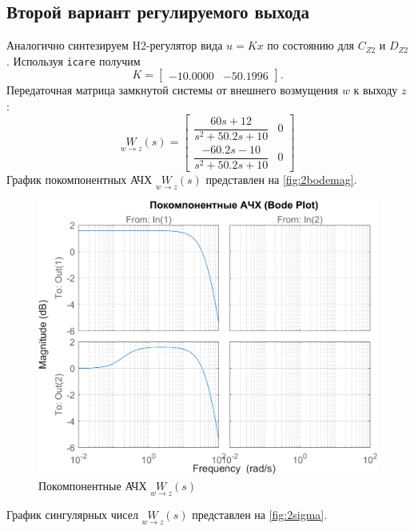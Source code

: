 \subsection{Второй вариант регулируемого выхода}
\label{sec:regout2}
Аналогично синтезируем H2-регулятор вида $u=Kx$ по состоянию для $C_{Z2}$ и $D_{Z2}$.
Используя \texttt{icare} получим
\begin{equation*}
    K=\begin{bmatrix}
        -10.0000&-50.1996
    \end{bmatrix}.
\end{equation*}
Передаточная матрица замкнутой системы от внешнего возмущения $w$ к выходу $z$:
\begin{equation*}
    \underset{w\rightarrow z}{W}(s)=\begin{bmatrix}
        \dfrac{ 60 s + 12}{s^2 + 50.2 s + 10} & 0 \\[2ex]
        \dfrac{-60.2 s - 10}{s^2+50.2s+10} & 0
    \end{bmatrix}
\end{equation*}
График покомпонентных АЧХ $\underset{w\rightarrow z}{W}(s)$ представлен на \autoref{fig:2bodemag}.
\begin{figure}[H]
    \centering
    \includegraphics[width=0.8\linewidth]{figs/2_bodemag.png}
    \caption{Покомпонентные АЧХ $\underset{w\rightarrow z}{W}(s)$}
    \label{fig:2bodemag}
\end{figure}
График сингулярных чисел $\underset{w\rightarrow z}{W}(s)$ представлен на \autoref{fig:2sigma}.
